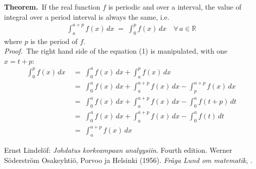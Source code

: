 \documentclass[12pt]{article}
\theoremstyle{definition}
\begin{document}
\textbf{Theorem.}\, If the real function $f$ is periodic and  over a  interval, the value of integral over a period interval is always the same, i.e.
\begin{align}
\int_a^{a+p}\!f(x)\,dx \;=\; \int_0^pf(x)\,dx \quad \forall\,a \in \mathbb{R}
\end{align}
where $p$ is the period of $f$.\\

{\em Proof.}\, The right hand side of the equation (1) is manipulated, with one  \,$x = t\!+\!p$:
\begin{align*}
\int_0^pf(x)\,dx & \;=\; \int_0^af(x)\,dx+\int_a^pf(x)\,dx\\
& \;=\; \int_0^af(x)\,dx+\int_a^{a+p}\!f(x)\,dx-\int_p^{a+p}\!f(x)\,dx\\ 
& \;=\; \int_0^af(x)\,dx+\int_a^{a+p}\!f(x)\,dx-\int_0^{a}f(t\!+\!p)\,dt\\
& \;=\; \int_0^af(x)\,dx+\int_a^{a+p}\!f(x)\,dx-\int_0^{a}f(t)\,dt\\
& \;=\; \int_a^{a+p}\!f(x)\,dx
\end{align*}

\begin{thebibliography}{8}
 {\sc Ernst Lindel\"of}: {\em Johdatus korkeampaan analyysiin}. Fourth edition. Werner S\"oderstr\"om Osakeyhti\"o, Porvoo ja Helsinki (1956).
 {\em Fr{\aa}ga Lund om matematik}, .
\end{thebibliography}
\end{document}

